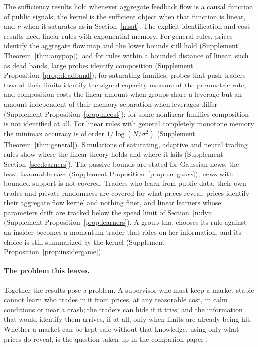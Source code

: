 The sufficiency results hold whenever aggregate feedback flow is a causal function of public signals; the kernel is the sufficient object when that function is linear, and $\nu$ when it saturates as in Section~\ref{n:sat}. The explicit identification and cost results need linear rules with exponential memory. For general rules, prices identify the aggregate flow map and the lower bounds still hold (Supplement Theorem~\ref{thm:anypop}), and for rules within a bounded distance of linear, such as dead bands, large probes identify composition (Supplement Proposition~\ref{prop:deadband}); for saturating families, probes that push traders toward their limits identify the signed capacity measure at the parametric rate, and composition costs the linear amount when groups share a leverage but an amount independent of their memory separation when leverages differ (Supplement Proposition~\ref{prop:nlcost}); for some nonlinear families composition is not identified at all. For linear rules with general completely monotone memory the minimax accuracy is of order $1/\log(N/\sigma^2)$ (Supplement Theorem~\ref{thm:general}). Simulations of saturating, adaptive and neural trading rules show where the linear theory holds and where it fails (Supplement Section~\ref{sec:learners}). The passive bounds are stated for Gaussian news, the least favourable case (Supplement Proposition~\ref{prop:nongauss}); news with bounded support is not covered. Traders who learn from public data, their own trades and private randomness are covered for what prices reveal: prices identify their aggregate flow kernel and nothing finer, and linear learners whose parameters drift are tracked below the speed limit of Section~\ref{n:dyn} (Supplement Proposition~\ref{prop:learners}). A group that chooses its rule against an insider becomes a momentum trader that rides on her information, and its choice is still summarized by the kernel (Supplement Proposition~\ref{prop:insidergame}).

\paragraph{The problem this leaves.} Together the results pose a problem. A supervisor who must keep a market stable cannot learn who trades in it from prices, at any reasonable cost, in calm conditions or near a crash; the traders can hide if it tries; and the information that would identify them arrives, if at all, only when limits are already being hit. Whether a market can be kept safe without that knowledge, using only what prices do reveal, is the question taken up in the companion paper \citep{niroula2026b}.

